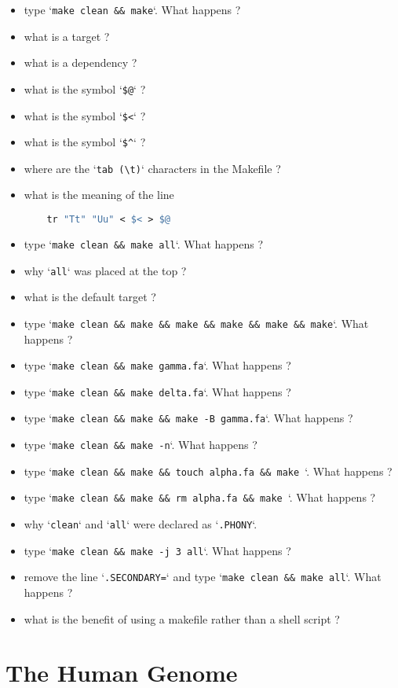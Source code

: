 \documentclass{article}
\newcommand{\code}[1]{`\texttt{#1}`}
\begin{document}
\begin{itemize}
\item type \code{make clean \&\& make}. What happens ?
\item what is a target ?
\item what is a dependency ?
\item what is the symbol  \code{\$@} ?
\item what is the symbol  \code{\$\textless} ?
\item what is the symbol  \code{\$\^} ?
\item where are the \code{tab (\textbackslash{}t)}  characters in the Makefile ?
\item what is the meaning of the line
\begin{lstlisting}[language=make]
%.rna:%.dna
	tr "Tt" "Uu" < $< > $@
\end{lstlisting}	
\item type \code{make clean \&\& make all}. What happens ?
\item why \code{all} was placed at the top ?
\item what is the default target ?
\item type \code{make clean \&\& make \&\& make \&\& make \&\& make \&\& make}. What happens ?
\item type \code{make clean \&\& make gamma.fa}. What happens ?
\item type \code{make clean \&\& make delta.fa}. What happens ?
\item type \code{make clean \&\& make \&\& make -B gamma.fa}. What happens ?
\item type \code{make clean \&\& make -n}. What happens ?
\item type \code{make clean \&\& make \&\& touch alpha.fa \&\& make }. What happens ?
\item type \code{make clean \&\& make \&\& rm alpha.fa \&\& make }. What happens ?
\item why \code{clean} and \code{all} were declared as \code{.PHONY}.
\item type \code{make clean \&\& make -j 3 all}. What happens ?
\item remove the line \code{.SECONDARY=} and type \code{make clean \&\& make all}. What happens ?
\item what is the benefit of using a makefile rather than a shell script ?
\end{itemize}

\section{The Human Genome}
\end{document}
